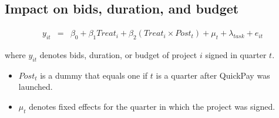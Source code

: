 \documentclass[
]{article}
\providecommand{\tightlist}{%
  \setlength{\itemsep}{0pt}\setlength{\parskip}{0pt}}
\begin{document}
\hypertarget{impact-on-bids-duration-and-budget}{%
\subsection{Impact on bids, duration, and
budget}\label{impact-on-bids-duration-and-budget}}

\[ \begin{aligned}
y_{it} &=& \beta_0 + \beta_1 Treat_i + \beta_2 (Treat_i \times Post_t) +\mu_t+ \lambda_{task}+ e_{it}
\end{aligned}\]

where \(y_{it}\) denotes bids, duration, or budget of project \(i\)
signed in quarter \(t\).

\begin{itemize}
\tightlist
\item
  \(Post_t\) is a dummy that equals one if \(t\) is a quarter after
  QuickPay was launched.
\item
  \(\mu_t\) denotes fixed effects for the quarter in which the project
  was signed.
\end{itemize}
\end{document}
